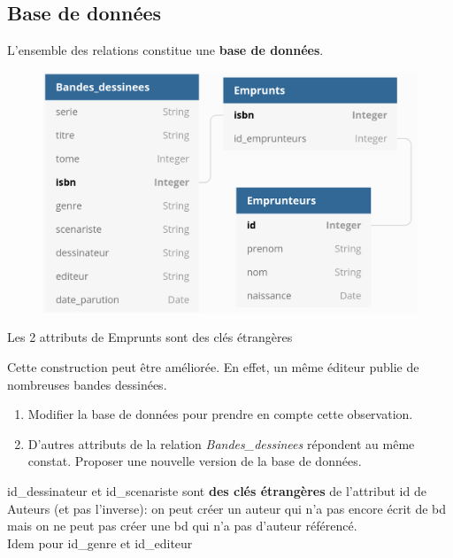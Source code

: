 \documentclass[a4paper,11pt]{article}
\begin{document}
\begin{Form}
\section{Base de données}
\begin{aretenir}[]
L'ensemble des relations constitue une \textbf{base de données}.
\end{aretenir}
\begin{figure}[!h]
\centering
\includegraphics[width=12cm]{ressources/cle_etrangere.png}
\label{bdd}
\end{figure}
\begin{commentprof}
Les 2 attributs de Emprunts sont des clés étrangères
\end{commentprof}
\begin{activite}
Cette construction peut être améliorée. En effet, un même éditeur publie de nombreuses bandes dessinées.
\begin{enumerate}
\item Modifier la base de données pour prendre en compte cette observation.
\item D'autres attributs de la relation \emph{Bandes\_dessinees} répondent au même constat. Proposer une nouvelle version de la base de données.
\end{enumerate}
\begin{commentprof}
id\_dessinateur et id\_scenariste sont \textbf{des clés étrangères} de l'attribut id de Auteurs (et pas l'inverse): on peut créer un auteur qui n'a pas encore écrit de bd mais on ne peut pas créer une bd qui n'a pas d'auteur référencé.\\
Idem pour id\_genre et id\_editeur
\end{commentprof}
\end{activite}
\end{Form}
\end{document}
